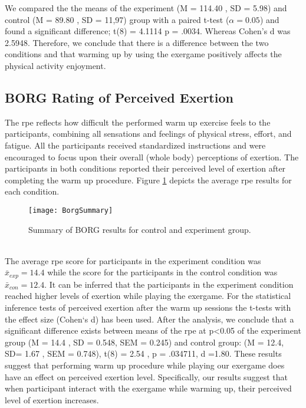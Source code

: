 We compared the the means of the experiment (M = 114.40 , SD = 5.98) and control (M = 89.80 , SD = 11,97) group with a paired t-test (\begin{math}\alpha = 0.05\end{math}) and found a significant difference; t(8) = 4.1114 p = .0034. Whereas Cohen's d was 2.5948. Therefore, we conclude that there is a difference between the two conditions and that warming up by using the exergame positively affects the physical activity enjoyment.
\subsection{BORG Rating of Perceived Exertion}
The \acrfull{rpe} reflects how difficult the performed warm up exercise feels to the participants, combining all sensations and feelings of physical stress, effort, and fatigue. All the participants received standardized instructions and were encouraged to focus upon their overall (whole body) perceptions of exertion. The participants in both conditions reported their perceived level of exertion after completing the warm up procedure.  Figure \ref{fig:borg} depicts the average \gls{rpe}  results for each condition.\\
\begin{figure}[h]
    \centering
    \texttt{[image: BorgSummary]}
    \caption{Summary of BORG results for control and experiment group.}
    \label{fig:borg}
\end{figure}\\
The average \gls{rpe} score for participants in the experiment condition was   \begin{math}\bar{x}_{exp} = 14.4 \end{math} while the score for the participants in the control condition was   \begin{math}\bar{x}_{con} = 12.4 \end{math}. It can be inferred that the participants in the experiment condition reached higher levels of exertion while playing the exergame. For the statistical inference tests of perceived exertion after the warm up sessions the t-tests with the effect size (Cohen`s d) has been used. After the analysis, we conclude that a significant difference exists  between means of the \gls{rpe}  at p\textless 0.05 of the experiment group (M = 14.4 , SD = 0.548, SEM = 0.245) and control group: (M = 12.4, SD= 1.67 , SEM = 0.748), t(8) = 2.54 , p = .034711, d =1.80.  These results suggest that performing warm up procedure while playing our exergame does have an effect on perceived exertion level. Specifically, our results suggest that when participant interact with the exergame while warming up, their perceived level of exertion increases.
